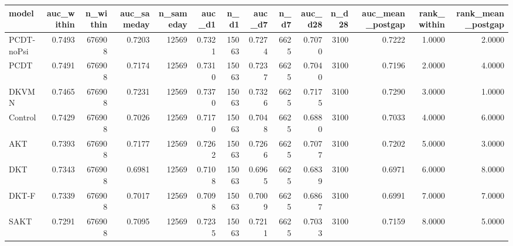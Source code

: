 \begin{tabular}{lrrrrrrrrrrrrr}
\toprule
model & auc\_within & n\_within & auc\_sameday & n\_sameday & auc\_d1 & n\_d1 & auc\_d7 & n\_d7 & auc\_d28 & n\_d28 & auc\_mean\_postgap & rank\_within & rank\_mean\_postgap \\
\midrule
PCDT-noPsi & 0.7493 & 676908 & 0.7203 & 12569 & 0.7321 & 15063 & 0.7274 & 6625 & 0.7070 & 3100 & 0.7222 & 1.0000 & 2.0000 \\
PCDT & 0.7491 & 676908 & 0.7174 & 12569 & 0.7310 & 15063 & 0.7237 & 6625 & 0.7040 & 3100 & 0.7196 & 2.0000 & 4.0000 \\
DKVMN & 0.7465 & 676908 & 0.7231 & 12569 & 0.7370 & 15063 & 0.7326 & 6625 & 0.7175 & 3100 & 0.7290 & 3.0000 & 1.0000 \\
Control & 0.7429 & 676908 & 0.7026 & 12569 & 0.7170 & 15063 & 0.7048 & 6625 & 0.6880 & 3100 & 0.7033 & 4.0000 & 6.0000 \\
AKT & 0.7393 & 676908 & 0.7177 & 12569 & 0.7262 & 15063 & 0.7266 & 6625 & 0.7077 & 3100 & 0.7202 & 5.0000 & 3.0000 \\
DKT & 0.7343 & 676908 & 0.6981 & 12569 & 0.7108 & 15063 & 0.6965 & 6625 & 0.6839 & 3100 & 0.6971 & 6.0000 & 8.0000 \\
DKT-F & 0.7339 & 676908 & 0.7017 & 12569 & 0.7098 & 15063 & 0.7009 & 6625 & 0.6867 & 3100 & 0.6991 & 7.0000 & 7.0000 \\
SAKT & 0.7291 & 676908 & 0.7095 & 12569 & 0.7235 & 15063 & 0.7211 & 6625 & 0.7033 & 3100 & 0.7159 & 8.0000 & 5.0000 \\
\bottomrule
\end{tabular}
